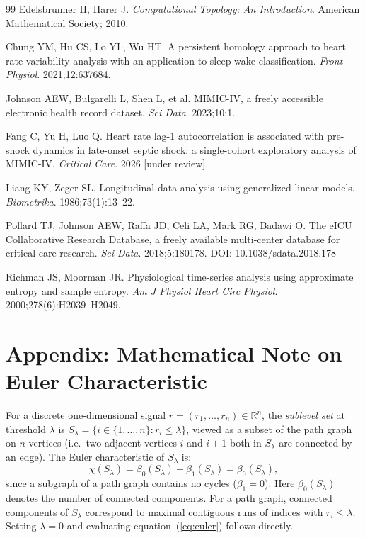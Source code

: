 \documentclass[12pt,a4paper]{article}
\begin{document}
\begin{thebibliography}{99}
Edelsbrunner H, Harer J.
\textit{Computational Topology: An Introduction}.
American Mathematical Society; 2010.

Chung YM, Hu CS, Lo YL, Wu HT.
A persistent homology approach to heart rate variability analysis with
an application to sleep-wake classification.
\textit{Front Physiol}. 2021;12:637684.

Johnson AEW, Bulgarelli L, Shen L, et al.
MIMIC-IV, a freely accessible electronic health record dataset.
\textit{Sci Data}. 2023;10:1.

Fang C, Yu H, Luo Q.
Heart rate lag-1 autocorrelation is associated with pre-shock dynamics
in late-onset septic shock: a single-cohort exploratory analysis of MIMIC-IV.
\textit{Critical Care}. 2026 [under review].

Liang KY, Zeger SL.
Longitudinal data analysis using generalized linear models.
\textit{Biometrika}. 1986;73(1):13--22.

Pollard TJ, Johnson AEW, Raffa JD, Celi LA, Mark RG, Badawi O.
The eICU Collaborative Research Database, a freely available
multi-center database for critical care research.
\textit{Sci Data}. 2018;5:180178.
DOI: 10.1038/sdata.2018.178

Richman JS, Moorman JR.
Physiological time-series analysis using approximate entropy and sample
entropy.
\textit{Am J Physiol Heart Circ Physiol}. 2000;278(6):H2039--H2049.

\end{thebibliography}

\clearpage
\appendix
\section*{Appendix: Mathematical Note on Euler Characteristic}
\label{app:math}

For a discrete one-dimensional signal
$r = (r_1, \ldots, r_n) \in \mathbb{R}^n$,
the \emph{sublevel set} at threshold $\lambda$ is
$S_\lambda = \{i \in \{1,\ldots,n\} : r_i \leq \lambda\}$,
viewed as a subset of the path graph on $n$ vertices
(i.e.\ two adjacent vertices $i$ and $i+1$ both in $S_\lambda$
are connected by an edge).
The Euler characteristic of $S_\lambda$ is:
\[
  \chi(S_\lambda)
  = \beta_0(S_\lambda) - \beta_1(S_\lambda)
  = \beta_0(S_\lambda),
\]
since a subgraph of a path graph contains no cycles ($\beta_1 = 0$).
Here $\beta_0(S_\lambda)$ denotes the number of connected components.
For a path graph, connected components of $S_\lambda$ correspond to
maximal contiguous runs of indices with $r_i \leq \lambda$.
Setting $\lambda = 0$ and evaluating equation~(\ref{eq:euler}) follows directly.
\end{document}
